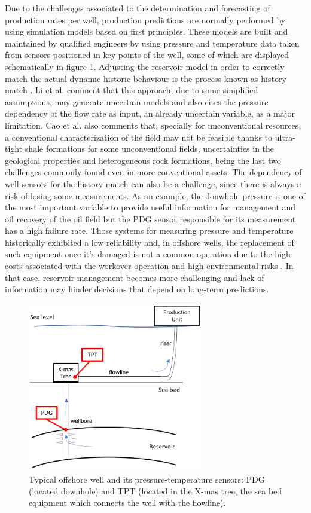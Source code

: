 \documentclass[conference]{IEEEtran}
\begin{document}
Due to the challenges associated to the determination and forecasting of production rates per 
well, production predictions are normally performed by using simulation models based on first 
principles. These models are built and maintained by qualified engineers by using pressure and 
temperature data taken from sensors positioned in key points of the well, some of which are 
displayed schematically in figure \ref{fig:pressureSensors}. Adjusting the reservoir model in 
order to correctly match the actual dynamic historic behaviour is the process known as history 
match \cite{alakeely2022simulating}. Li et al. \cite{Li2019} comment that this approach, due 
to some simplified assumptions, may generate uncertain models and also cites the pressure 
dependency of the flow rate as input, an already uncertain variable, as a major limitation. 
Cao et al. \cite{CaoQ2016} also comments that, specially for unconventional resources, a 
conventional characterization of the field may not be feasible thanks to ultra-tight shale 
formations for some unconventional fields, uncertainties in the geological properties and 
heterogeneous rock formations, being the last two challenges commonly found even in more 
conventional assets. The dependency of well sensors for the history match can also be a 
challenge, since there is always a risk of losing some measurements. As an example, the 
donwhole pressure is one of the most important variable to provide useful information for 
management and oil recovery of the oil field \cite{camponogara2010automation} but the PDG 
sensor responsible for its measurement has a high failure rate. Those systems for measuring 
pressure and temperature historically exhibited a low reliability \cite{Gisbergen2001} and, 
in offshore wells, the replacement of such equipment once it's damaged is not a common 
operation due to the high costs associated with the workover operation and high environmental 
risks \cite{Freitas2021}. In that case, reservoir management becomes more challenging and lack 
of information may hinder decisions that depend on long-term predictions. 

\begin{figure}[htbp]
\centerline{\includegraphics[width=3.0in]{wellScheme.png}}
\caption{Typical offshore well and its pressure-temperature sensors: PDG (located downhole) and TPT (located in the X-mas tree, the sea bed equipment which connects the well with the flowline).}
\label{fig:pressureSensors}
\end{figure}
\end{document}
